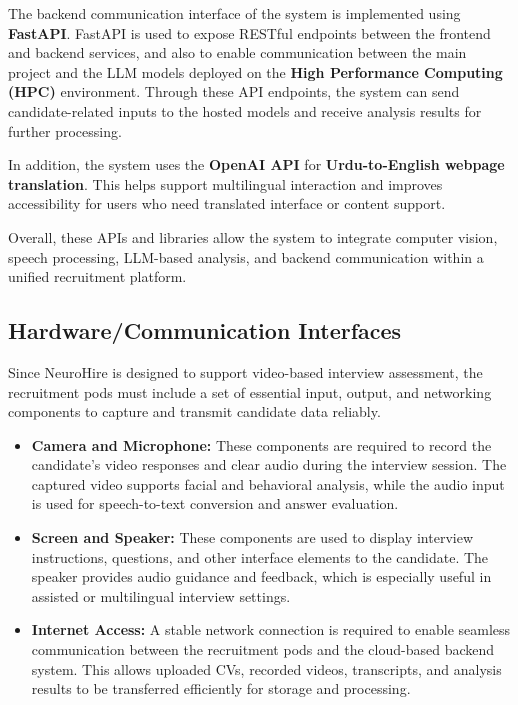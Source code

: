 The backend communication interface of the system is implemented using \textbf{FastAPI}. FastAPI is used to expose RESTful endpoints between the frontend and backend services, and also to enable communication between the main project and the LLM models deployed on the \textbf{High Performance Computing (HPC)} environment. Through these API endpoints, the system can send candidate-related inputs to the hosted models and receive analysis results for further processing.

In addition, the system uses the \textbf{OpenAI API} for \textbf{Urdu-to-English webpage translation}. This helps support multilingual interaction and improves accessibility for users who need translated interface or content support.

Overall, these APIs and libraries allow the system to integrate computer vision, speech processing, LLM-based analysis, and backend communication within a unified recruitment platform.

\subsection{Hardware/Communication Interfaces}
Since NeuroHire is designed to support video-based interview assessment, the recruitment pods must include a set of essential input, output, and networking components to capture and transmit candidate data reliably.

\begin{itemize}
    \item \textbf{Camera and Microphone:} These components are required to record the candidate's video responses and clear audio during the interview session. The captured video supports facial and behavioral analysis, while the audio input is used for speech-to-text conversion and answer evaluation.

    \item \textbf{Screen and Speaker:} These components are used to display interview instructions, questions, and other interface elements to the candidate. The speaker provides audio guidance and feedback, which is especially useful in assisted or multilingual interview settings.

    \item \textbf{Internet Access:} A stable network connection is required to enable seamless communication between the recruitment pods and the cloud-based backend system. This allows uploaded CVs, recorded videos, transcripts, and analysis results to be transferred efficiently for storage and processing.
\end{itemize}

